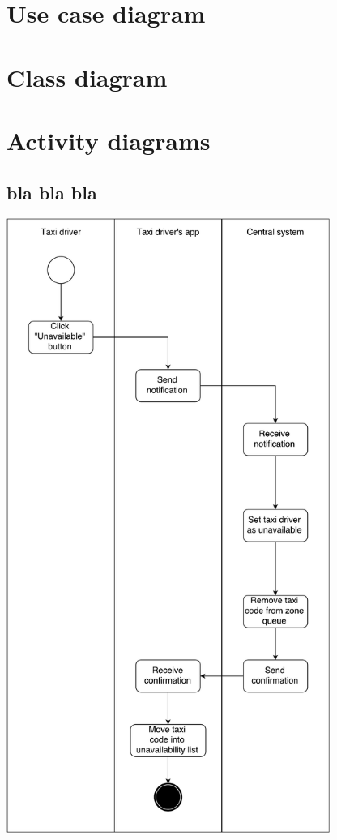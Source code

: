 \section{Use case diagram}
\begin{landscape}

\end{landscape}


\section{Class diagram}
\begin{landscape}
%

\end{landscape}


\section{Activity diagrams}

\subsection{bla bla bla}

\includegraphics[width=300pt,keepaspectratio]{pdfs/05_unavailable.pdf}


